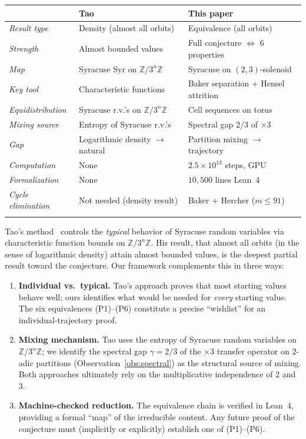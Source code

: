 \documentclass{CUP-JNL-FMP}%
\theoremstyle{definition}
\numberwithin{equation}{section}
\newcommand{\ZZ}{\mathbb{Z}}
\newcommand{\Syr}{\mathrm{Syr}}
\begin{document}
\begin{table}[t]
\tabcolsep=4pt
{\begin{fntable}
\begin{tabular*}{\textwidth}{@{\extracolsep{\fill}}lll@{}}
\toprule
& \textbf{Tao~\cite{Tao2022}} & \textbf{This paper} \\
\midrule
\emph{Result type} & Density (almost all orbits) & Equivalence (all orbits) \\
\emph{Strength} & Almost bounded values & Full conjecture $\Leftrightarrow$ 6 properties \\
\emph{Map} & Syracuse $\Syr$ on $\ZZ/3^n\ZZ$ & Syracuse on $(2,3)$-solenoid \\
\emph{Key tool} & Characteristic functions & Baker separation + Hensel attrition \\
\emph{Equidistribution} & Syracuse r.v.'s on $\ZZ/3^n\ZZ$ & Cell sequences on torus \\
\emph{Mixing source} & Entropy of Syracuse r.v.'s & Spectral gap $2/3$ of $\times 3$ \\
\emph{Gap} & Logarithmic density $\to$ natural & Partition mixing $\to$ trajectory \\
\emph{Computation} & None & $2.5 \times 10^{13}$ steps, GPU \\
\emph{Formalization} & None & $10{,}500$ lines Lean~4 \\
\emph{Cycle elimination} & Not needed (density result) & Baker + Hercher ($m \leq 91$) \\
\botrule
\end{tabular*}
\end{fntable}}
\end{table}

Tao's method~\cite{Tao2022} controls the \emph{typical} behavior of Syracuse
random variables via characteristic function bounds on $\ZZ/3^n\ZZ$. His result, that
almost all orbits (in the sense of logarithmic density) attain almost bounded
values, is the deepest partial result toward the conjecture. Our framework
complements this in three ways:
\begin{enumerate}
  \item \textbf{Individual vs.\ typical.} Tao's approach proves that most starting
    values behave well; ours identifies what would be needed for \emph{every}
    starting value. The six equivalences (P1)--(P6) constitute a precise
    ``wishlist'' for an individual-trajectory proof.
  \item \textbf{Mixing mechanism.} Tao uses the entropy of Syracuse random variables
    on $\ZZ/3^n\ZZ$; we identify the spectral gap $\gamma = 2/3$ of the $\times 3$
    transfer operator on $2$-adic partitions (Observation~\ref{obs:spectral}) as
    the structural source of mixing. Both approaches ultimately rely on the
    multiplicative independence of $2$ and $3$.
  \item \textbf{Machine-checked reduction.} The equivalence chain is verified in
    Lean~4, providing a formal ``map'' of the irreducible content. Any future
    proof of the conjecture must (implicitly or explicitly) establish one of
    (P1)--(P6).
\end{enumerate}
\end{document}
